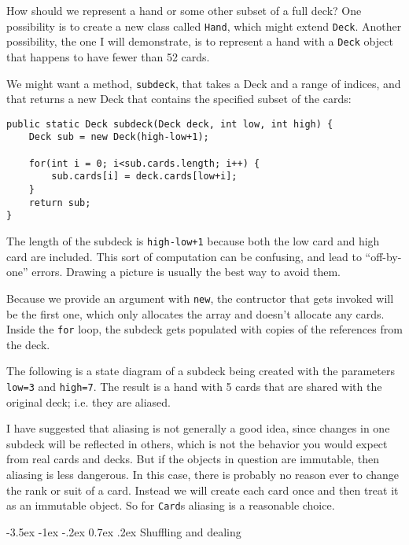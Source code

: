 \documentclass{book}
\makeatletter
\renewcommand{\section}{\@startsection 
    {section} {1} {0mm}%
    {-3.5ex \@plus -1ex \@minus -.2ex}%
    {0.7ex \@plus.2ex}%
    {\normalfont\Large\bfseries}}
\newcommand{\beforefig}{\vspace{1.3\parskip}}
\newcommand{\afterfig}{\vspace{-0.2\parskip}}
\newcommand{\myfig}[1]{
    \beforefig
    \centerline{\epsfig{#1,scale=0.8}}
    \afterfig
}
\makeatother
\begin{document}
How should we represent a hand or some other subset of a full deck?
One possibility is to create a new class called {\tt Hand}, which
might extend {\tt Deck}.  Another possibility, the one I will
demonstrate, is to represent a hand with a {\tt Deck} object that
happens to have fewer than 52 cards.

We might want a method, {\tt subdeck}, that takes a Deck
and a range of indices, and that returns a new Deck that
contains the specified subset of the cards:

\begin{verbatim}
public static Deck subdeck(Deck deck, int low, int high) {
    Deck sub = new Deck(high-low+1);
	
    for(int i = 0; i<sub.cards.length; i++) {
        sub.cards[i] = deck.cards[low+i];
    }
    return sub;
}
\end{verbatim}

The length of the subdeck is {\tt high-low+1} because both the low
card and high card are included.  This sort of computation can be
confusing, and lead to ``off-by-one'' errors.  Drawing a picture is
usually the best way to avoid them.


Because we provide an argument with {\tt new}, the
contructor that gets invoked will be the first one, which only
allocates the array and doesn't allocate any cards.  Inside the
{\tt for} loop, the subdeck gets populated with copies of the
references from the deck.

The following is a state diagram of a subdeck being created with the
parameters {\tt low=3} and {\tt high=7}.  The result is a hand with 5
cards that are shared with the original deck; i.e. they are aliased.

\myfig{figure=figs/subdeck.eps}


I have suggested that aliasing is not generally a good idea, since
changes in one subdeck will be reflected in others, which is not the
behavior you would expect from real cards and decks.  But if the
objects in question are immutable, then aliasing is less dangerous.
In this case, there is probably no reason ever to change the
rank or suit of a card.  Instead we will create each card
once and then treat it as an immutable object.  So for {\tt Card}s
aliasing is a reasonable choice.


\section{Shuffling and dealing}
\end{document}
